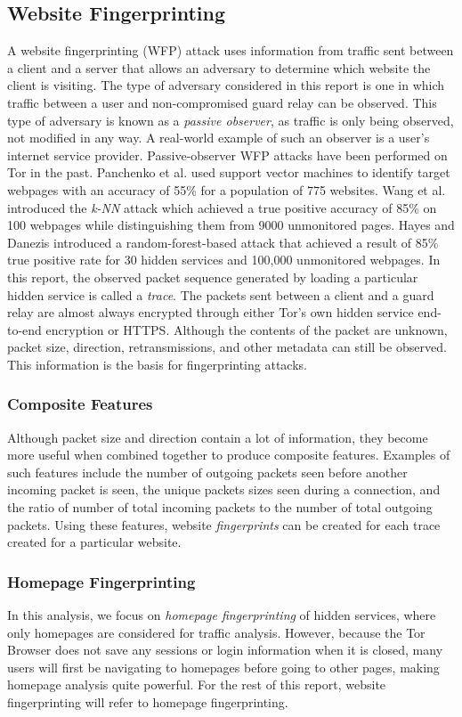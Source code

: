 \documentclass[11pt]{article}
\begin{document}
\subsection{Website Fingerprinting}
A website fingerprinting (WFP) attack uses information from traffic sent between a client and a server that allows an adversary to determine which website the client is visiting. The type of adversary considered in this report is one in which traffic between a user and non-compromised guard relay can be observed. This type of adversary is known as a \textit{passive observer}, as traffic is only being observed, not modified in any way. A real-world example of such an observer is a user's internet service provider. Passive-observer WFP attacks have been performed on Tor in the past. Panchenko et al.\cite{panchenko} used support vector machines to identify target webpages with an accuracy of 55\% for a population of 775 websites. Wang et al.\cite{wang} introduced the \textit{k-NN} attack which achieved a true positive accuracy of 85\% on 100 webpages while distinguishing them from 9000 unmonitored pages. Hayes and Danezis\cite{hayes} introduced a random-forest-based attack that achieved a result of 85\% true positive rate for 30 hidden services and 100,000 unmonitored webpages.
In this report, the observed packet sequence generated by loading a particular hidden service is called a \textit{trace}. The packets sent between a client and a guard relay are almost always encrypted through either Tor's own hidden service end-to-end encryption or HTTPS. Although the contents of the packet are unknown, packet size, direction, retransmissions, and other metadata can still be observed. This information is the basis for fingerprinting attacks.

\subsubsection{Composite Features}
Although packet size and direction contain a lot of information, they become more useful when combined together to produce composite features. Examples of such features include the number of outgoing packets seen before another incoming packet is seen, the unique packets sizes seen during a connection, and the ratio of number of total incoming packets to the number of total outgoing packets. Using these features, website \textit{fingerprints} can be created for each trace created for a particular website.

\subsubsection{Homepage Fingerprinting}
In this analysis, we focus on \textit{homepage fingerprinting} of hidden services, where only homepages are considered for traffic analysis. However, because the Tor Browser does not save any sessions or login information when it is closed, many users will first be navigating to homepages before going to other pages, making homepage analysis quite powerful. For the rest of this report, website fingerprinting will refer to homepage fingerprinting.
\end{document}
